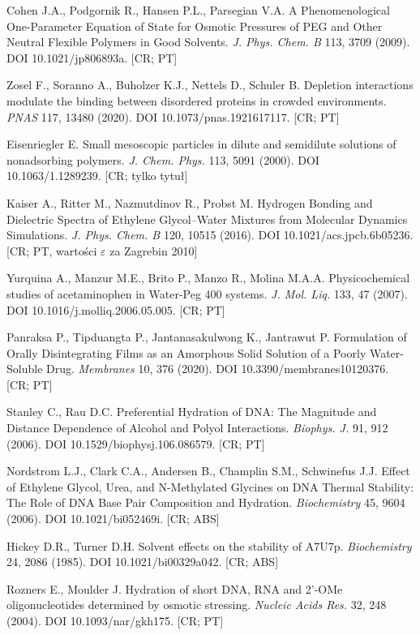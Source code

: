 \documentclass[10pt,a4paper]{article}
\begin{document}
\begin{enumerate}[label={[\arabic*]},ref={\arabic*},leftmargin=*,itemsep=0pt]
\item\label{b:cohen} Cohen J.A., Podgornik R., Hansen P.L., Parsegian V.A. A Phenomenological One-Parameter Equation of State for Osmotic Pressures of PEG and Other Neutral Flexible Polymers in Good Solvents. \emph{J. Phys. Chem. B} 113, 3709 (2009). DOI 10.1021/jp806893a. [CR; PT]
\item\label{b:zosel} Zosel F., Soranno A., Buholzer K.J., Nettels D., Schuler B. Depletion interactions modulate the binding between disordered proteins in crowded environments. \emph{PNAS} 117, 13480 (2020). DOI 10.1073/pnas.1921617117. [CR; PT]
\item\label{b:eis00} Eisenriegler E. Small mesoscopic particles in dilute and semidilute solutions of nonadsorbing polymers. \emph{J. Chem. Phys.} 113, 5091 (2000). DOI 10.1063/1.1289239. [CR; tylko tytuł]
\item\label{b:kaiser} Kaiser A., Ritter M., Nazmutdinov R., Probst M. Hydrogen Bonding and Dielectric Spectra of Ethylene Glycol--Water Mixtures from Molecular Dynamics Simulations. \emph{J. Phys. Chem. B} 120, 10515 (2016). DOI 10.1021/acs.jpcb.6b05236. [CR; PT, wartości $\varepsilon$ za Zagrebin 2010]
\item\label{b:yurquina} Yurquina A., Manzur M.E., Brito P., Manzo R., Molina M.A.A. Physicochemical studies of acetaminophen in Water-Peg 400 systems. \emph{J. Mol. Liq.} 133, 47 (2007). DOI 10.1016/j.molliq.2006.05.005. [CR; PT]
\item\label{b:panraksa} Panraksa P., Tipduangta P., Jantanasakulwong K., Jantrawut P. Formulation of Orally Disintegrating Films as an Amorphous Solid Solution of a Poorly Water-Soluble Drug. \emph{Membranes} 10, 376 (2020). DOI 10.3390/membranes10120376. [CR; PT]
\item\label{b:stanley} Stanley C., Rau D.C. Preferential Hydration of DNA: The Magnitude and Distance Dependence of Alcohol and Polyol Interactions. \emph{Biophys. J.} 91, 912 (2006). DOI 10.1529/biophysj.106.086579. [CR; PT]
\item\label{b:nordstrom} Nordstrom L.J., Clark C.A., Andersen B., Champlin S.M., Schwinefus J.J. Effect of Ethylene Glycol, Urea, and N-Methylated Glycines on DNA Thermal Stability: The Role of DNA Base Pair Composition and Hydration. \emph{Biochemistry} 45, 9604 (2006). DOI 10.1021/bi052469i. [CR; ABS]
\item\label{b:hickey} Hickey D.R., Turner D.H. Solvent effects on the stability of A7U7p. \emph{Biochemistry} 24, 2086 (1985). DOI 10.1021/bi00329a042. [CR; ABS]
\item\label{b:rozners} Rozners E., Moulder J. Hydration of short DNA, RNA and 2'-OMe oligonucleotides determined by osmotic stressing. \emph{Nucleic Acids Res.} 32, 248 (2004). DOI 10.1093/nar/gkh175. [CR; PT]

\end{enumerate}
\end{document}

